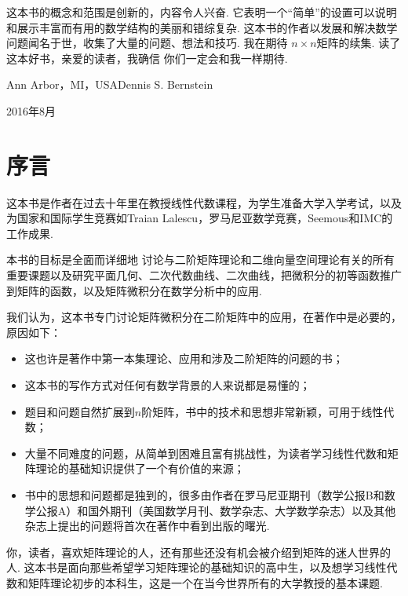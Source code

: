 这本书的概念和范围是创新的，内容令人兴奋. 它表明一个“简单”的设置可以说明和展示丰富而有用的数学结构的美丽和错综复杂. 这本书的作者以发展和解决数学问题闻名于世，收集了大量的问题、想法和技巧. 我在期待
$n\times n$矩阵的续集. 读了这本好书，亲爱的读者，我确信
你们一定会和我一样期待.

\vspace*{1cm}
\noindent Ann Arbor，MI，USA\hfill Dennis S. Bernstein

\noindent 2016年8月

\clearpage
\chapter*{序言}


这本书是作者在过去十年里在教授线性代数课程，为学生准备大学入学考试，以及为国家和国际学生竞赛如Traian Lalescu，罗马尼亚数学竞赛，Seemous和IMC的工作成果.

本书的目标是{\kaishu 全面而详细地} 讨论与二阶矩阵理论和二维向量空间理论有关的所有重要课题以及研究平面几何、二次代数曲线、二次曲线，把微积分的初等函数推广到矩阵的函数，以及矩阵微积分在数学分析中的应用.
\begin{mybox}
  我们认为，这本书专门讨论矩阵微积分在二阶矩阵中的应用，在著作中是必要的，原因如下：
  \begin{itemize}
    \item 这也许是著作中第一本集理论、应用和涉及二阶矩阵的问题的书；
    \item 这本书的写作方式对任何有数学背景的人来说都是易懂的；
    \item 题目和问题自然扩展到$n$阶矩阵，书中的技术和思想非常新颖，可用于线性代数；
    \item 大量不同难度的问题，从简单到困难且富有挑战性，为读者学习线性代数和矩阵理论的基础知识提供了一个有价值的来源；
    \item 书中的思想和问题都是独到的，很多由作者在罗马尼亚期刊（{\kaishu 数学公报B和数学公报A}）和国外期刊（{\kaishu 美国数学月刊、数学杂志、大学数学杂志}）以及其他杂志上提出的问题将首次在著作中看到出版的曙光.
  \end{itemize}
\end{mybox}


你，读者，喜欢矩阵理论的人，还有那些还没有机会被介绍到矩阵的迷人世界的人. 这本书是面向那些希望学习矩阵理论的基础知识的高中生，以及想学习线性代数和矩阵理论初步的本科生，这是一个在当今世界所有的大学教授的基本课题.

